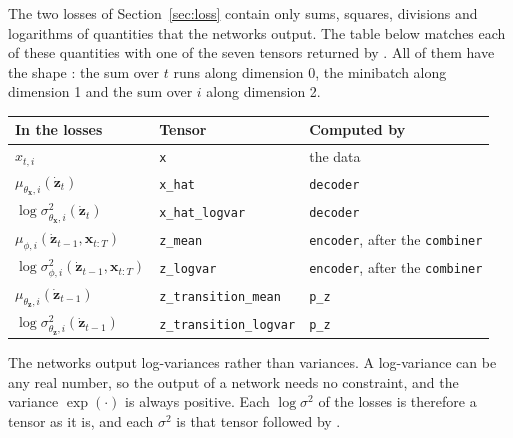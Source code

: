 The two losses of Section~\ref{sec:loss} contain only sums, squares,
divisions and logarithms of quantities that the networks output. The
table below matches each of these quantities with one of the seven
tensors returned by . All of them have the shape
: the sum over $t$ runs along
dimension 0, the minibatch along dimension 1 and the sum over $i$ along
dimension 2.
\begin{center}
\renewcommand{\arraystretch}{1.25}
\begin{tabular}{|l|l|l|}
\hline
\textbf{In the losses} & \textbf{Tensor} & \textbf{Computed by} \\ \hline
$x_{t,i}$ & \texttt{x} & the data \\ \hline
$\mu_{\theta_{\mathbf{x}}, i}(\dot{\mathbf{z}}_{t})$ &
\texttt{x\_hat} & \texttt{decoder} \\ \hline
$\log \sigma^2_{\theta_{\mathbf{x}}, i}(\dot{\mathbf{z}}_{t})$ &
\texttt{x\_hat\_logvar} & \texttt{decoder} \\ \hline
$\mu_{\phi, i}(\dot{\mathbf{z}}_{t-1}, \mathbf{x}_{t:T})$ &
\texttt{z\_mean} & \texttt{encoder}, after the \texttt{combiner} \\ \hline
$\log \sigma^2_{\phi, i}(\dot{\mathbf{z}}_{t-1}, \mathbf{x}_{t:T})$ &
\texttt{z\_logvar} & \texttt{encoder}, after the \texttt{combiner} \\ \hline
$\mu_{\theta_{\mathbf{z}}, i}(\dot{\mathbf{z}}_{t-1})$ &
\texttt{z\_transition\_mean} & \texttt{p\_z} \\ \hline
$\log \sigma^2_{\theta_{\mathbf{z}}, i}(\dot{\mathbf{z}}_{t-1})$ &
\texttt{z\_transition\_logvar} & \texttt{p\_z} \\ \hline
\end{tabular}
\end{center}
The networks output log-variances rather than variances. A log-variance
can be any real number, so the output of a network needs no constraint,
and the variance $\exp(\cdot)$ is always positive. Each $\log \sigma^2$
of the losses is therefore a tensor as it is, and each $\sigma^2$ is
that tensor followed by .\\

